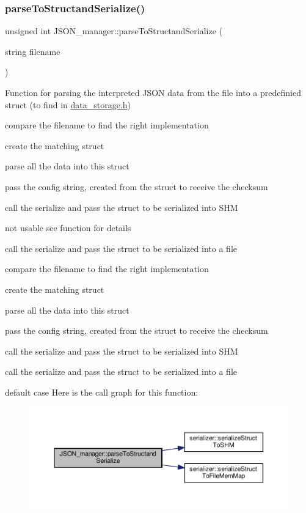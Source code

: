 \subsubsection{\texorpdfstring{parse\+To\+Structand\+Serialize()}{parseToStructandSerialize()}}
{\footnotesize\ttfamily unsigned int J\+S\+O\+N\+\_\+manager\+::parse\+To\+Structand\+Serialize (\begin{DoxyParamCaption}\item[{string}]{filename }\end{DoxyParamCaption})}



Function for parsing the interpreted J\+S\+ON data from the file into a predefinied struct (to find in \hyperlink{data__storage_8h}{data\+\_\+storage.\+h}) 

compare the filename to find the right implementation

create the matching struct

parse all the data into this struct

pass the config string, created from the struct to receive the checksum

call the serialize and pass the struct to be serialized into S\+HM

not usable see function for details

call the serialize and pass the struct to be serialized into a file

compare the filename to find the right implementation

create the matching struct

parse all the data into this struct

pass the config string, created from the struct to receive the checksum

call the serialize and pass the struct to be serialized into S\+HM

call the serialize and pass the struct to be serialized into a file

default case Here is the call graph for this function\+:
\nopagebreak
\begin{figure}[H]
\begin{center}
\leavevmode
\includegraphics[width=350pt]{classJSON__manager_a7bb6db218d195494ca939233671cb183_cgraph}
\end{center}
\end{figure}
\mbox{\label{classJSON__manager_a9b600a34d73fd3f28bf00ddf3f2e6640}} 
